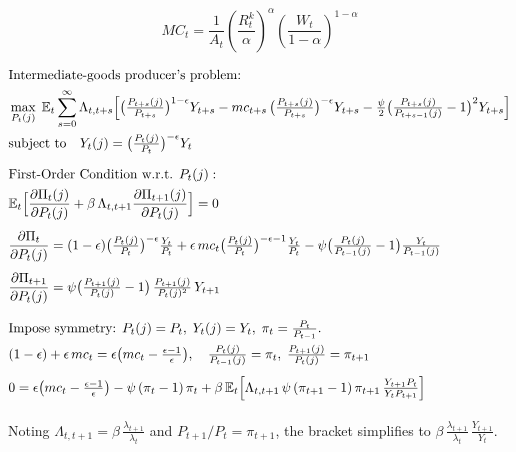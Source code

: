 \documentclass[11pt,preprint]{elsarticle}
\numberwithin{equation}{section}
\numberwithin{figure}{section}
\numberwithin{table}{section}
\begin{document}
\begin{equation}\label{marginal_cost}
\boxed{MC_t = \dfrac{1}{A_t} \left( \dfrac{R_t^k}{\alpha} \right)^{\alpha} \left( \dfrac{W_t}{1-\alpha} \right)^{1-\alpha}}
\end{equation}

\begin{align*}
& \text{Intermediate‐goods producer’s problem:} \\
& \max_{P_t(j)} \;\mathbb{E}_t \sum_{s=0}^{\infty} \Lambda_{t,t+s}
  \Bigl[
    \bigl(\tfrac{P_{t+s}(j)}{P_{t+s}}\bigr)^{1-\epsilon} Y_{t+s}
    - mc_{t+s}\,\bigl(\tfrac{P_{t+s}(j)}{P_{t+s}}\bigr)^{-\epsilon} Y_{t+s}
    - \tfrac{\psi}{2}\bigl(\tfrac{P_{t+s}(j)}{P_{t+s-1}(j)} - 1\bigr)^2 Y_{t+s}
  \Bigr] \\
& \text{subject to} \quad Y_t(j) = \bigl(\tfrac{P_t(j)}{P_t}\bigr)^{-\epsilon} Y_t
\\[1.5ex]
& \text{First‐Order Condition w.r.t. }P_t(j): \\
& \mathbb{E}_t\Bigl[
    \frac{\partial \Pi_t(j)}{\partial P_t(j)}
    + \beta\,\Lambda_{t,t+1}
      \frac{\partial \Pi_{t+1}(j)}{\partial P_t(j)}
  \Bigr] = 0
\\[1ex]
& \frac{\partial \Pi_t}{\partial P_t(j)}
  = (1-\epsilon)\bigl(\tfrac{P_t(j)}{P_t}\bigr)^{-\epsilon}\tfrac{Y_t}{P_t}
    + \epsilon\,mc_t\bigl(\tfrac{P_t(j)}{P_t}\bigr)^{-\epsilon-1}\tfrac{Y_t}{P_t}
    - \psi\bigl(\tfrac{P_t(j)}{P_{t-1}(j)}-1\bigr)\tfrac{Y_t}{P_{t-1}(j)}
\\[1ex]
& \frac{\partial \Pi_{t+1}}{\partial P_t(j)}
  = \psi\bigl(\tfrac{P_{t+1}(j)}{P_t(j)}-1\bigr)\,\tfrac{P_{t+1}(j)}{P_t(j)^2}\,Y_{t+1}
\\[2ex]
& \text{Impose symmetry: }P_t(j)=P_t,\;Y_t(j)=Y_t,\;\pi_t=\tfrac{P_t}{P_{t-1}}.\\
& (1-\epsilon)+\epsilon\,mc_t = \epsilon\bigl(mc_t-\tfrac{\epsilon-1}{\epsilon}\bigr),\quad
  \tfrac{P_t(j)}{P_{t-1}(j)}=\pi_t,\;\tfrac{P_{t+1}(j)}{P_t(j)}=\pi_{t+1}
\\[1ex]
& 0 = \epsilon\bigl(mc_t-\tfrac{\epsilon-1}{\epsilon}\bigr)
      - \psi\,(\pi_t-1)\,\pi_t
      + \beta\,\mathbb{E}_t\Bigl[
          \Lambda_{t,t+1}\,\psi\,(\pi_{t+1}-1)\,\pi_{t+1}
          \,\tfrac{Y_{t+1}P_t}{Y_tP_{t+1}}
        \Bigr]
\\[1ex]
\end{align*}

Noting \(\Lambda_{t,t+1}=\beta\,\tfrac{\lambda_{t+1}}{\lambda_t}\) and
\(P_{t+1}/P_t=\pi_{t+1}\), the bracket simplifies to
\(\beta\,\tfrac{\lambda_{t+1}}{\lambda_t}\,\tfrac{Y_{t+1}}{Y_t}\).
\end{document}
